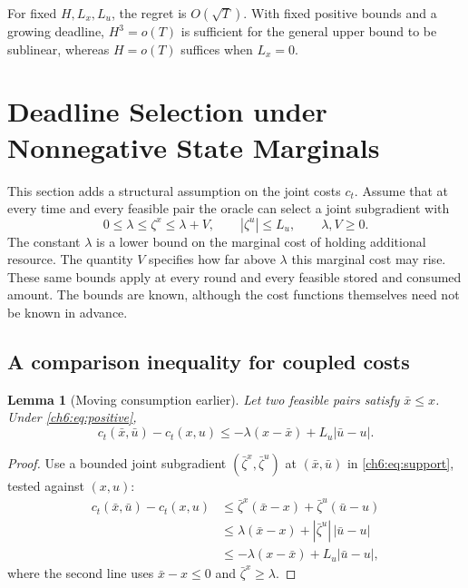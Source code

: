 \documentclass[11pt]{article}
\theoremstyle{plain}
\newtheorem{Thm:Lemma}[Thm:Theorem]{Lemma}
\theoremstyle{remark}
\numberwithin{equation}{section}
\begin{document}
For fixed $H,L_x,L_u$, the regret is $O(\sqrt T)$. With fixed positive
bounds and a growing deadline, $H^3=o(T)$ is sufficient for the general
upper bound to be sublinear, whereas $H=o(T)$ suffices when $L_x=0$.

\section{Deadline Selection under Nonnegative State Marginals}
\label{ch6:sec:positive}
This section adds a structural assumption on the joint costs $c_t$.
Assume that at every time
and every feasible pair the oracle can select a joint subgradient with
\begin{equation}\label{ch6:eq:positive}
 0\le\lambda\le\zeta^x\le\lambda+V,\qquad |\zeta^u|\le L_u,
 \qquad \lambda,V\ge0.
\end{equation}
The constant $\lambda$ is a lower bound on the marginal cost of holding
additional resource. The quantity $V$ specifies how far above $\lambda$
this marginal cost may rise. These same bounds apply at every round and
every feasible stored and consumed amount. The bounds are known,
although the cost functions themselves need not be known in advance.

\subsection{A comparison inequality for coupled costs}
\begin{Thm:Lemma}[Moving consumption earlier]\label{ch6:lem:earlier}
Let two feasible pairs satisfy $\bar x\le x$. Under \eqref{ch6:eq:positive},
\begin{equation}\label{ch6:eq:earlier}
 c_t(\bar x,\bar u)-c_t(x,u)
 \le-\lambda(x-\bar x)+L_u|\bar u-u|.
\end{equation}
\end{Thm:Lemma}
\begin{proof}
Use a bounded joint subgradient $(\bar\zeta^x,\bar\zeta^u)$ at
$(\bar x,\bar u)$ in \eqref{ch6:eq:support}, tested against $(x,u)$:
\begin{align*}
c_t(\bar x,\bar u)-c_t(x,u)
&\le\bar\zeta^x(\bar x-x)+\bar\zeta^u(\bar u-u)\\
&\le\lambda(\bar x-x)+|\bar\zeta^u|\,|\bar u-u|\\
&\le-\lambda(x-\bar x)+L_u|\bar u-u|,
\end{align*}
where the second line uses $\bar x-x\le0$ and
$\bar\zeta^x\ge\lambda$.
\end{proof}
\end{document}

